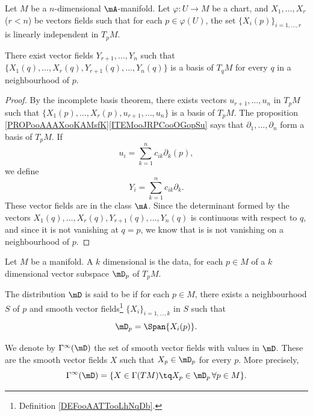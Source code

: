 \begin{lemma}       \label{LEMooGHQZooMIWAfn}
	Let \( M\) be a \( n\)-dimensional \( \mA\)-manifold. Let \( \varphi\colon U\to M\) be a chart, and \( X_1,\ldots, X_r\) (\( r<n\)) be vectors fields such that for each \( p\in \varphi(U)\), the set \( \{ X_i(p) \}_{i=1,\ldots, r}\) is linearly independent in \( T_pM\).

	There exist vector fields \( Y_{r+1},\ldots,  Y_n\) such that \( \{  X_1(q),\ldots, X_r(q), Y_{r+1}(q),\ldots, Y_n(q) \}\) is a basis of \( T_qM\) for every \( q\) in a neighbourhood of \( p\).
\end{lemma}

\begin{proof}
	By the incomplete basis theorem, there exists vectors \( u_{r+1},\ldots, u_n\) in \( T_pM\) such that \( \{ X_1(p),\ldots, X_r(p), u_{r+1},\ldots,u_n \}\) is a basis of \( T_pM\). The proposition \ref{PROPooAAAXooKAMsfK}\ref{ITEMooJRPCooOGopSu} says that \( \partial_1,\ldots,\partial_n\) form a basis of \( T_pM\). If
	\begin{equation}
		u_i=\sum_{k=1}^nc_{ik}\partial_k(p),
	\end{equation}
	we define
	\begin{equation}
		Y_i=\sum_{k=1}^nc_{ik}\partial_k.
	\end{equation}
	These vector fields are in the class \( \mA\). Since the determinant formed by the vectors \( X_1(q),\ldots,X_r(q), Y_{r+1}(q),\ldots,Y_n(q)\) is continuous with respect to \( q\), and since it is not vanishing at \( q=p\), we know that is is not vanishing on a neighbourhood of \( p\).
\end{proof}

\begin{definition}      \label{DEFooYOMHooZJvsSt}
	Let \( M\) be a manifold. A \( k\) dimensional  is the data, for each \( p\in M\) of a \( k\) dimensional vector subspace \( \mD_p\) of \( T_pM\).

	The distribution \( \mD\) is said to be  if for each \( p\in M\), there exists a neighbourhood \( S\) of \( p\) and smooth vector fields\footnote{Definition \ref{DEFooAATTooLhNqDb}.} \( \{ X_i \}_{i=1,\ldots, k}\) in \( S\) such that
	\begin{equation}
		\mD_p=\Span\{ X_i(p) \}.
	\end{equation}

	We denote by \( \Gamma^{\infty}(\mD) \) the set of smooth vector fields with values in \( \mD\). These are the smooth vector fields \( X\) such that \( X_p\in \mD_p\) for every \( p\). More precisely,
	\begin{equation}
		\Gamma^{\infty}(\mD)=\{ X\in \Gamma(TM)\tq X_p\in\mD_p\,\forall p\in M \}.
	\end{equation}
\end{definition}

